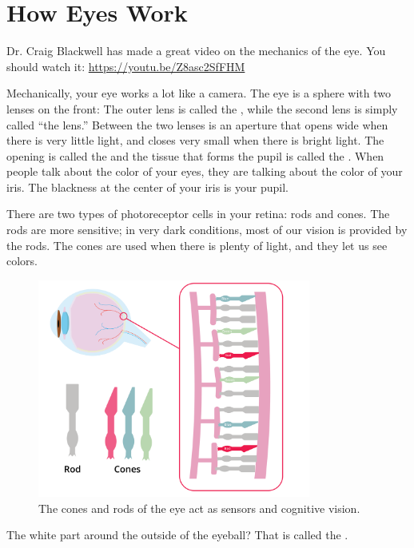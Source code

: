 \chapter{How Eyes Work}
Dr. Craig Blackwell has made a great video on the mechanics of the
eye. You should watch it: \url{https://youtu.be/Z8asc2SfFHM}

Mechanically, your eye works a lot like a camera.  The eye is a sphere
with two lenses on the front: The outer lens is called the , while the
second lens is simply called ``the lens.''
Between the two lenses is an aperture that opens wide when there is
very little light, and closes very small when there is bright light.
The opening is called the  and the tissue that forms
the pupil is called the . When people talk about the color
of your eyes, they are talking about the color of your iris. The
blackness at the center of your iris is your pupil.

There are two types of photoreceptor cells in your retina: rods and
cones. The rods are more sensitive; in very dark conditions, most of
our vision is provided by the rods. The cones are used when there is
plenty of light, and they let us see colors.
\begin{figure}[htbp]
    \centering
    \includegraphics[width=0.8\textwidth]{conerod.png}
    \caption{The cones and rods of the eye act as sensors and cognitive vision.}
    \label{fig:conerod}
\end{figure}

The white part around the outside of the eyeball? That is called the
.

